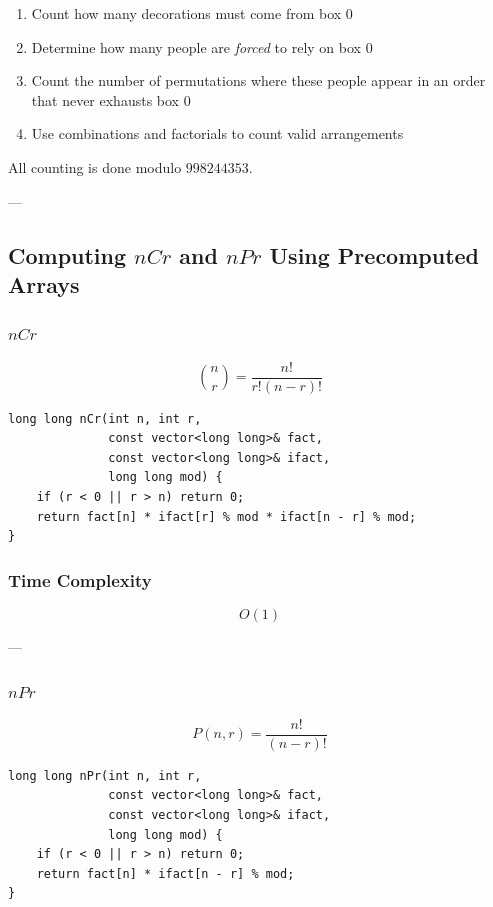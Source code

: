 \documentclass[11pt]{article}
\begin{document}
\begin{enumerate}
    \item Count how many decorations must come from box $0$
    \item Determine how many people are \emph{forced} to rely on box $0$
    \item Count the number of permutations where these people appear
          in an order that never exhausts box $0$
    \item Use combinations and factorials to count valid arrangements
\end{enumerate}

All counting is done modulo $998244353$.

---


\subsection{Computing $nCr$ and $nPr$ Using Precomputed Arrays}

\subsubsection{$nCr$}
\[
\binom{n}{r} = \frac{n!}{r!(n-r)!}
\]

\begin{lstlisting}
long long nCr(int n, int r,
              const vector<long long>& fact,
              const vector<long long>& ifact,
              long long mod) {
    if (r < 0 || r > n) return 0;
    return fact[n] * ifact[r] % mod * ifact[n - r] % mod;
}
\end{lstlisting}

\subsubsection{Time Complexity}
\[
O(1)
\]

---

\subsubsection{$nPr$}
\[
P(n,r) = \frac{n!}{(n-r)!}
\]

\begin{lstlisting}
long long nPr(int n, int r,
              const vector<long long>& fact,
              const vector<long long>& ifact,
              long long mod) {
    if (r < 0 || r > n) return 0;
    return fact[n] * ifact[n - r] % mod;
}
\end{lstlisting}
\end{document}
